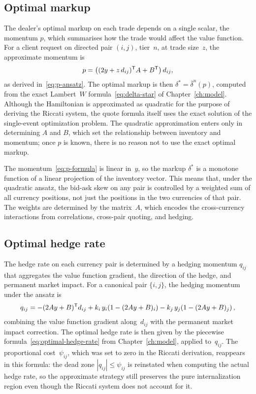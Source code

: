 \subsection{Optimal markup}

The dealer's optimal markup on each trade depends on a single scalar, the momentum $p$, which summarises how the trade would affect the value function. For a client request on directed pair $(i,j)$, tier~$n$, at trade size~$z$, the approximate momentum is
\begin{equation}
  \label{eq:p-formula}
  p = \bigl((2y + z\,d_{ij})^{\mathsf{T}} A + B^{\mathsf{T}}\bigr)\,d_{ij},
\end{equation}
as derived in~\eqref{eq:p-ansatz}. The optimal markup is then $\delta^* = \bar\delta^n(p)$, computed from the exact Lambert~$W$ formula~\eqref{eq:delta-star} of Chapter~\ref{ch:model}. Although the Hamiltonian is approximated as quadratic for the purpose of deriving the Riccati system, the quote formula itself uses the exact solution of the single-event optimization problem. The quadratic approximation enters only in determining $A$ and $B$, which set the relationship between inventory and momentum; once $p$ is known, there is no reason not to use the exact optimal markup.

The momentum~\eqref{eq:p-formula} is linear in~$y$, so the markup $\delta^*$ is a monotone function of a linear projection of the inventory vector. This means that, under the quadratic ansatz, the bid-ask skew on any pair is controlled by a weighted sum of all currency positions, not just the positions in the two currencies of that pair. The weights are determined by the matrix~$A$, which encodes the cross-currency interactions from correlations, cross-pair quoting, and hedging.

\subsection{Optimal hedge rate}

The hedge rate on each currency pair is determined by a hedging momentum $q_{ij}$ that aggregates the value function gradient, the direction of the hedge, and permanent market impact. For a canonical pair $\{i,j\}$, the hedging momentum under the ansatz is
\begin{equation}
  \label{eq:q-formula}
  q_{ij} = -(2Ay + B)^{\mathsf{T}} d_{ij} + k_i\,y_i\!\left(1 - (2Ay + B)_i\right) - k_j\,y_j\!\left(1 - (2Ay + B)_j\right),
\end{equation}
combining the value function gradient along~$d_{ij}$ with the permanent market impact correction. The optimal hedge rate is then given by the piecewise formula~\eqref{eq:optimal-hedge-rate} from Chapter~\ref{ch:model}, applied to~$q_{ij}$. The proportional cost~$\psi_{ij}$, which was set to zero in the Riccati derivation, reappears in this formula: the dead zone $|q_{ij}| \leq \psi_{ij}$ is reinstated when computing the actual hedge rate, so the approximate strategy still preserves the pure internalization region even though the Riccati system does not account for it.


